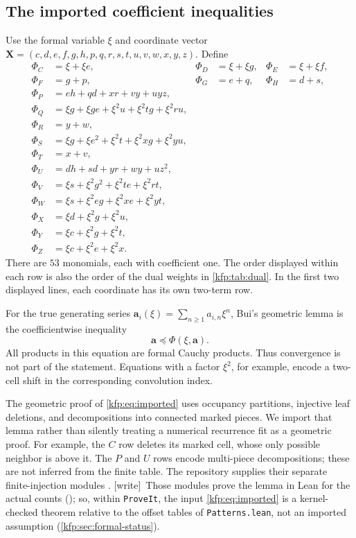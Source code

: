 \documentclass[11pt,a4paper]{article}
\theoremstyle{definition}
\theoremstyle{remark}
\newcommand{\bA}{\boldsymbol a}
\newcommand{\bX}{\boldsymbol X}
\newcommand{\repo}{\texttt{ProveIt}}
\newcommand{\wtag}{\textsf{\small[write]}}
\begin{document}
\subsection{The imported coefficient inequalities}
Use the formal variable $\xi$ and coordinate vector
$\bX=(c,d,e,f,g,h,p,q,r,s,t,u,v,w,x,y,z)$. Define
\begin{equation}\label{eq:map}
\begin{aligned}
\Phi_C&=\xi+\xi e,&\Phi_D&=\xi+\xi g,&\Phi_E&=\xi+\xi f,\\
\Phi_F&=g+p,&\Phi_G&=e+q,&\Phi_H&=d+s,\\
\Phi_P&=eh+qd+xr+vy+uyz,\\
\Phi_Q&=\xi g+\xi ge+\xi^2u+\xi^2tg+\xi^2ru,\\
\Phi_R&=y+w,\\
\Phi_S&=\xi g+\xi e^2+\xi^2t+\xi^2xg+\xi^2yu,\\
\Phi_T&=x+v,\\
\Phi_U&=dh+sd+yr+wy+uz^2,\\
\Phi_V&=\xi s+\xi^2g^2+\xi^2te+\xi^2rt,\\
\Phi_W&=\xi s+\xi^2eg+\xi^2xe+\xi^2yt,\\
\Phi_X&=\xi d+\xi^2g+\xi^2u,\\
\Phi_Y&=\xi c+\xi^2g+\xi^2t,\\
\Phi_Z&=\xi c+\xi^2e+\xi^2x.
\end{aligned}
\end{equation}
There are $53$ monomials, each with coefficient one. The order displayed
within each row is also the order of the dual weights in
\cref{kfp:tab:dual}. In the first two displayed lines, each coordinate has its
own two-term row.

For the true generating series
$\bA_i(\xi)=\sum_{n\geq1}a_{i,n}\xi^n$, Bui's geometric lemma is the
coefficientwise inequality
\begin{equation}\label{kfp:eq:imported}
 \bA\preceq\Phi(\xi,\bA).
\end{equation}
All products in this equation are formal Cauchy products. Thus convergence is
not part of the statement. Equations with a factor $\xi^2$, for example,
encode a two-cell shift in the corresponding convolution index.

The geometric proof of \eqref{kfp:eq:imported} uses occupancy partitions,
injective leaf deletions, and decompositions into connected marked pieces.
We import that lemma rather than silently treating a numerical recurrence
fit as a geometric proof. For example, the $C$ row deletes its marked cell,
whose only possible neighbor is above it. The $P$ and $U$ rows encode
multi-piece decompositions; these are not inferred from the finite table.
The repository supplies their separate finite-injection modules
\cite{bui,repocomplete}.
\wtag\ Those modules prove the lemma in Lean for the actual counts
(); so, within \repo, the input
\eqref{kfp:eq:imported} is a kernel-checked theorem relative to the offset
tables of \texttt{Patterns.lean}, not an imported assumption
(\cref{kfp:sec:formal-status}).
\end{document}
